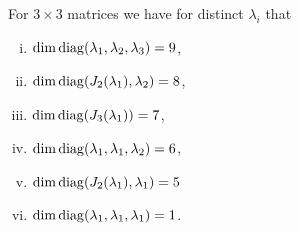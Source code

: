 \documentclass{article}
\begin{document}
For $3\times3$ matrices we have for distinct $\lambda_i$ that 
\begin{enumerate}[(i)]
	\item $\dim\operatorname{diag}(\lambda_1,\lambda_2,\lambda_3)=9$,
	\item $\dim\operatorname{diag}( J_2(\lambda_1), \lambda_2)=8$, 
	\item $\dim\operatorname{diag}( J_3(\lambda_1))=7$,
	\item $\dim\operatorname{diag}(\lambda_1,\lambda_1,\lambda_2)=6$,
	\item $\dim\operatorname{diag}(J_2(\lambda_1),\lambda_1)=5$
	\item $\dim\operatorname{diag}(\lambda_1,\lambda_1,\lambda_1)=1$.
\end{enumerate}





\end{document}
